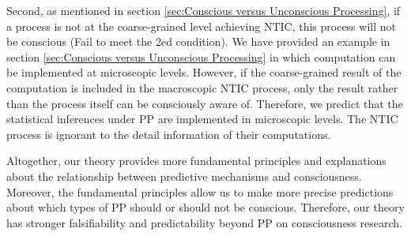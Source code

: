 \documentclass[utf8]{article}
\begin{document}
    		Second, as mentioned in section \ref{sec:Conscious versus Unconscious Processing}, if a process is not at the coarse-grained level achieving NTIC, this process will not be conscious (Fail to meet the 2\lowercase{ed} condition). We have provided an example in section \ref{sec:Conscious versus Unconscious Processing} in which computation can be implemented at microscopic levels. However, if the coarse-grained result of the computation is included in the macroscopic NTIC process, only the result rather than the process itself can be consciously aware of. Therefore, we predict that the statistical inferences under PP are implemented in microscopic levels. The NTIC process is ignorant to the detail information of their computations. 
    
            Altogether, our theory provides more fundamental principles and explanations about the relationship between predictive mechanisms and consciousness. Moreover, the fundamental principles allow us to make more precise predictions about which types of PP should or should not be conscious. Therefore, our theory has stronger falsifiability and predictability beyond PP on consciousness research.
\end{document}
